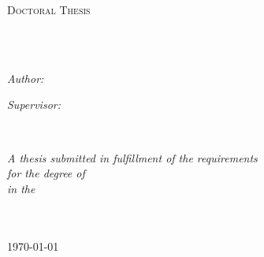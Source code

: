 \documentclass[
11pt, %
oneside, %
english, %
singlespacing, %
headsepline, %
]{MastersDoctoralThesis} %
\author{Marco \textsc{Radavelli}} %
\theoremstyle{plain}
\theoremstyle{definition}
\theoremstyle{remark}
\theoremstyle{remark}
\theoremstyle{plain}
\theoremstyle{plain}
\begin{document}
\frontmatter %

\pagestyle{plain} %


\begin{titlepage}
\begin{center}

\vspace*{.06\textheight}
{\scshape\LARGE \univname\par}\vspace{1.5cm} %
\textsc{\Large Doctoral Thesis}\\[0.5cm] %

\HRule \\[0.4cm] %
{\huge \bfseries \ttitle\par}\vspace{0.4cm} %
\HRule \\[1.5cm] %
 
\begin{minipage}[t]{0.4\textwidth}
\begin{flushleft} \large
\emph{Author:}\\
\href{http://www.johnsmith.com}{\authorname} %
\end{flushleft}
\end{minipage}
\begin{minipage}[t]{0.4\textwidth}
\begin{flushright} \large
\emph{Supervisor:} \\
\href{http://www.jamessmith.com}{\supname} %
\end{flushright}
\end{minipage}\\[3cm]
 
\vfill

\large \textit{A thesis submitted in fulfillment of the requirements\\ for the degree of \degreename}\\[0.3cm] %
\textit{in the}\\[0.4cm]
\groupname\\\deptname\\[2cm] %
 
\vfill

{\large \today}\\[4cm] %
 
\vfill
\end{center}
\end{titlepage}
\end{document}
